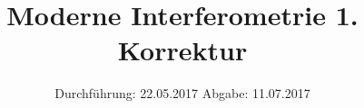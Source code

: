 

\subject{V64}
\title{Moderne Interferometrie 1. Korrektur}
\date{
  Durchführung: 22.05.2017
  \hspace{3em}
  Abgabe: 11.07.2017
}



\maketitle
\thispagestyle{empty}
\tableofcontents
\newpage







\printbibliography


